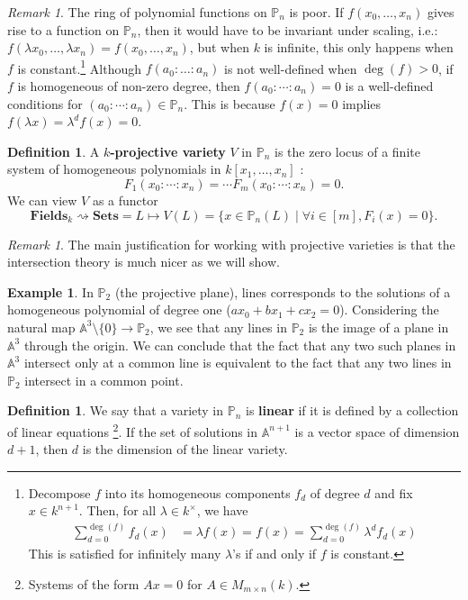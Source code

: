 \documentclass{tufte-handout} %
\theoremstyle{definition}
\newtheorem{defn}[thm]{Definition}
\newtheorem{exmp}[thm]{Example}
\theoremstyle{remark}
\newtheorem{rem}[thm]{Remark}
\newcommand{\bA}{\mathbb{A}}
\renewcommand{\P}{\mathbb{P}}
\begin{document}
\begin{rem}
	The ring of polynomial functions on $\P_n$ is poor. If $f(x_0, \dots, x_n)$ gives rise to a function on $\P_n$, then it would have to be invariant under scaling, i.e.: $f(\lambda x_0, \dots, \lambda x_n) = f(x_0, \dots, x_n)$, but when $k$ is infinite, this only happens when $f$ is constant.\footnote{Decompose $f$ into its homogeneous components $f_d$ of degree $d$ and fix $x \in k^{n+1}$. Then, for all $\lambda \in k^{\times}$, we have 
	\begin{align*}
	\sum_{d=0}^{\deg(f)} f_d(x) &=\lambda f(x)
	= f(x)
	= \sum_{d=0}^{\deg(f)} \lambda^d f_d(x)	
	\end{align*}
	This is satisfied for infinitely many $\lambda$'s if and only if $f$ is constant.} Although $f(a_0: \dots : a_n)$ is not well-defined when $\deg(f) > 0$, if $f$ is homogeneous of non-zero degree, then $f(a_0 : \cdots :a_n) = 0$ is a well-defined conditions for $(a_0:\cdots :a_n) \in \P_n$. This is because $f(x) = 0$ implies  $f(\lambda x) = \lambda^d f(x) = 0$.
\end{rem}
\begin{defn}
	A \textbf{$k$-projective variety} $V$ in $\P_n$ is the zero locus of a finite system of homogeneous polynomials in $k[x_1,\dots, x_n]$ :
	\[F_1(x_0:\cdots :x_n) = \cdots F_m(x_0:\cdots : x_n) = 0.\]
	We can view $V$ as a functor \[\textbf{Fields}_k \rightsquigarrow \textbf{Sets} = L \mapsto V(L) = \{x \in \P_n(L) \mid \forall i \in [m], F_i(x) = 0\}.\]
\end{defn}
\begin{rem}
	The main justification for working with projective varieties is that the intersection theory is much nicer as we will show.
\end{rem}
\begin{exmp}
	In $\P_2$ (the projective plane), lines corresponds to the solutions of a homogeneous polynomial of degree one ($ax_0+bx_1+cx_2= 0$). Considering the natural map $\bA^3 \setminus\{0\} \rightarrow \P_2$, we see that any lines in $\P_2$ is the image of a plane in $\bA^3$ through the origin. We can conclude that the fact that any two such planes in $\bA^3$ intersect only at a common line is equivalent to the fact that any two lines in $\P_2$ intersect in a common point.
\end{exmp}
\begin{defn}
	We say that a variety in $\P_n$ is \textbf{linear} if it is defined by a collection of linear equations \footnote{Systems of the form $Ax = 0$ for $A \in M_{m\times n}(k)$.}. If the set of solutions in $\bA^{n+1}$ is a vector space of dimension $d+1$, then $d$ is the dimension of the linear variety.
\end{defn}
\end{document}
